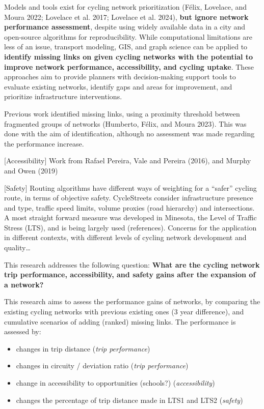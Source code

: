 \documentclass[
  sn-nature,
]{sn-jnl}
\begin{document}
Models and tools exist for cycling network prioritization (Félix,
Lovelace, and Moura 2022; Lovelace et al. 2017; Lovelace et al. 2024),
\textbf{but ignore network performance assessment}, despite using widely
available data in a city and open-source algorithms for reproducibility.
While computational limitations are less of an issue, transport
modeling, GIS, and graph science can be applied to \textbf{identify
missing links on given cycling networks with the potential to improve
network performance, accessibility, and cycling uptake}. These
approaches aim to provide planners with decision-making support tools to
evaluate existing networks, identify gaps and areas for improvement, and
prioritize infrastructure interventions.

Previous work identified missing links, using a proximity threshold
between fragmented groups of networks (Humberto, Félix, and Moura 2023).
This was done with the aim of identification, although no assessment was
made regarding the performance increase.

{[}Accessibility{]} Work from Rafael Pereira, Vale and Pereira (2016),
and Murphy and Owen (2019)

{[}Safety{]} Routing algorithms have different ways of weighting for a
``safer'' cycling route, in terms of objective safety. CycleStreets
consider infrastructure presence and type, traffic speed limits, volume
proxies (road hierarchy) and intersections. A most straight forward
measure was developed in Minesota, the Level of Traffic Stress (LTS),
and is being largely used (references). Concerns for the application in
different contexts, with different levels of cycling network development
and quality\ldots{}

This research addresses the following question: \textbf{What are the
cycling network trip performance, accessibility, and safety gains after
the expansion of a network?}

This research aims to assess the performance gains of networks, by
comparing the existing cycling networks with previous existing ones (3
year difference), and cumulative scenarios of adding (ranked) missing
links. The performance is assessed by:

\begin{itemize}
\item
  changes in trip distance (\emph{trip performance})
\item
  changes in circuity / deviation ratio (\emph{trip performance})
\item
  change in accessibility to opportunities (schools?)
  (\emph{accessibility})
\item
  changes the percentage of trip distance made in LTS1 and LTS2
  (\emph{safety})
\end{itemize}
\end{document}

